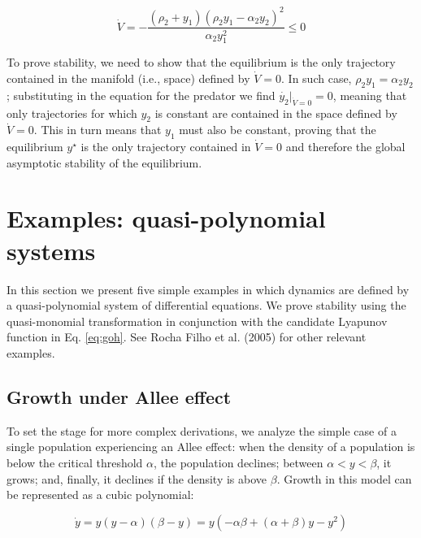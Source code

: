 \documentclass{article}
\begin{document}
\begin{cb}
\begin{equation}
\dot{V} = -\frac{(\rho_2 + y_1) (\rho_2 y_1 - \alpha_2 y_2)^2}{\alpha_2 y_1^2} \leq 0
\end{equation}

To prove stability, we need to show that the equilibrium is the only trajectory contained in the manifold (i.e., space) defined by $\dot{V} = 0$. In such case, $\rho_2 y_1 = \alpha_2 y_2$; substituting in the equation for the predator we find $\dot{y_2}|_{\dot{V} = 0} = 0$, meaning that only trajectories for which $y_2$ is constant are contained in the space defined by $\dot{V} = 0$. This in turn means that $y_1$ must also be constant, proving that the equilibrium $y^\star$ is the only trajectory contained in $\dot{V} = 0$ and therefore the global asymptotic stability of the equilibrium.
\end{cb}

\hypertarget{examples-quasi-polynomial-systems}{%
\section{Examples: quasi-polynomial
systems}\label{examples-quasi-polynomial-systems}}

In this section we present five simple examples in which dynamics are
defined by a quasi-polynomial system of differential equations. We prove
stability using the quasi-monomial transformation in conjunction with
the candidate Lyapunov function in Eq. \ref{eq:goh}. See Rocha Filho et
al. (2005) for other relevant examples.

\hypertarget{growth-under-allee-effect}{%
\subsection{Growth under Allee effect}\label{growth-under-allee-effect}}

To set the stage for more complex derivations, we analyze the simple
case of a single population experiencing an Allee effect: when the
density of a population is below the critical threshold \(\alpha\), the
population declines; between \(\alpha < y < \beta\), it grows; and,
finally, it declines if the density is above \(\beta\). Growth in this
model can be represented as a cubic polynomial:

\begin{equation}
\dot{y} = y (y - \alpha) (\beta - y) = y(-\alpha \beta + (\alpha + \beta) y - y^2)
\end{equation}
\end{document}
